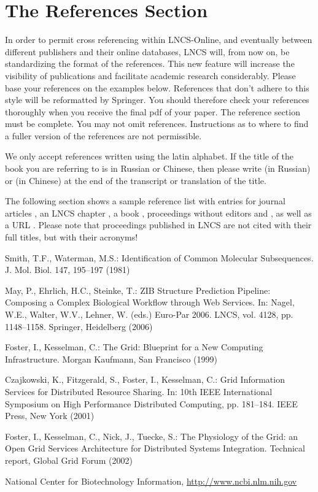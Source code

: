 \documentclass[runningheads,a4paper]{llncs}
\begin{document}
\section{The References Section}\label{references}

In order to permit cross referencing within LNCS-Online, and eventually
between different publishers and their online databases, LNCS will,
from now on, be standardizing the format of the references. This new
feature will increase the visibility of publications and facilitate
academic research considerably. Please base your references on the
examples below. References that don't adhere to this style will be
reformatted by Springer. You should therefore check your references
thoroughly when you receive the final pdf of your paper.
The reference section must be complete. You may not omit references.
Instructions as to where to find a fuller version of the references are
not permissible.

We only accept references written using the latin alphabet. If the title
of the book you are referring to is in Russian or Chinese, then please write
(in Russian) or (in Chinese) at the end of the transcript or translation
of the title.

The following section shows a sample reference list with entries for
journal articles \cite{jour}, an LNCS chapter \cite{lncschap}, a book
\cite{book}, proceedings without editors \cite{proceeding1} and
\cite{proceeding2}, as well as a URL \cite{url}.
Please note that proceedings published in LNCS are not cited with their
full titles, but with their acronyms!

\begin{thebibliography}{4}

 Smith, T.F., Waterman, M.S.: Identification of Common Molecular
Subsequences. J. Mol. Biol. 147, 195--197 (1981)

 May, P., Ehrlich, H.C., Steinke, T.: ZIB Structure Prediction Pipeline:
Composing a Complex Biological Workflow through Web Services. In: Nagel,
W.E., Walter, W.V., Lehner, W. (eds.) Euro-Par 2006. LNCS, vol. 4128,
pp. 1148--1158. Springer, Heidelberg (2006)

 Foster, I., Kesselman, C.: The Grid: Blueprint for a New Computing
Infrastructure. Morgan Kaufmann, San Francisco (1999)

 Czajkowski, K., Fitzgerald, S., Foster, I., Kesselman, C.: Grid
Information Services for Distributed Resource Sharing. In: 10th IEEE
International Symposium on High Performance Distributed Computing, pp.
181--184. IEEE Press, New York (2001)

 Foster, I., Kesselman, C., Nick, J., Tuecke, S.: The Physiology of the
Grid: an Open Grid Services Architecture for Distributed Systems
Integration. Technical report, Global Grid Forum (2002)

 National Center for Biotechnology Information, \url{http://www.ncbi.nlm.nih.gov}

\end{thebibliography}
\end{document}
